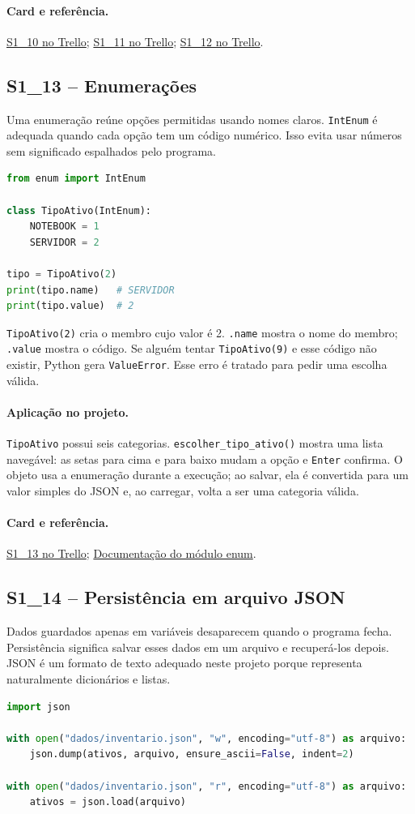 \documentclass[11pt,a4paper]{article}
\newcommand{\projeto}{\paragraph{Aplicação no projeto.}}
\newcommand{\referencia}[2]{\paragraph{Card e referência.}\href{#1}{#2}}
\newcommand{\cardsection}[1]{\Needspace{12\baselineskip}\subsection{#1}}
\begin{document}
\referencia{https://trello.com/c/EurwtLl9}{S1\_10 no Trello}; \href{https://trello.com/c/qEvT77g5}{S1\_11 no Trello}; \href{https://trello.com/c/N1J9NE4k}{S1\_12 no Trello}.

\cardsection{S1\_13 -- Enumerações}

Uma enumeração reúne opções permitidas usando nomes claros. \texttt{IntEnum} é adequada quando cada opção tem um código numérico. Isso evita usar números sem significado espalhados pelo programa.

\begin{lstlisting}[language=Python,caption={Exemplo de IntEnum}]
from enum import IntEnum

class TipoAtivo(IntEnum):
    NOTEBOOK = 1
    SERVIDOR = 2

tipo = TipoAtivo(2)
print(tipo.name)   # SERVIDOR
print(tipo.value)  # 2
\end{lstlisting}

\texttt{TipoAtivo(2)} cria o membro cujo valor é 2. \texttt{.name} mostra o nome do membro; \texttt{.value} mostra o código. Se alguém tentar \texttt{TipoAtivo(9)} e esse código não existir, Python gera \texttt{ValueError}. Esse erro é tratado para pedir uma escolha válida.

\projeto
\texttt{TipoAtivo} possui seis categorias. \texttt{escolher\_tipo\_ativo()} mostra uma lista navegável: as setas para cima e para baixo mudam a opção e \texttt{Enter} confirma. O objeto usa a enumeração durante a execução; ao salvar, ela é convertida para um valor simples do JSON e, ao carregar, volta a ser uma categoria válida.

\referencia{https://trello.com/c/nJrQKljh}{S1\_13 no Trello}; \href{https://docs.python.org/3/library/enum.html}{Documentação do módulo enum}.

\cardsection{S1\_14 -- Persistência em arquivo JSON}

Dados guardados apenas em variáveis desaparecem quando o programa fecha. Persistência significa salvar esses dados em um arquivo e recuperá-los depois. JSON é um formato de texto adequado neste projeto porque representa naturalmente dicionários e listas.

\begin{lstlisting}[language=Python,caption={Gravar e ler JSON}]
import json

with open("dados/inventario.json", "w", encoding="utf-8") as arquivo:
    json.dump(ativos, arquivo, ensure_ascii=False, indent=2)

with open("dados/inventario.json", "r", encoding="utf-8") as arquivo:
    ativos = json.load(arquivo)
\end{lstlisting}
\end{document}
